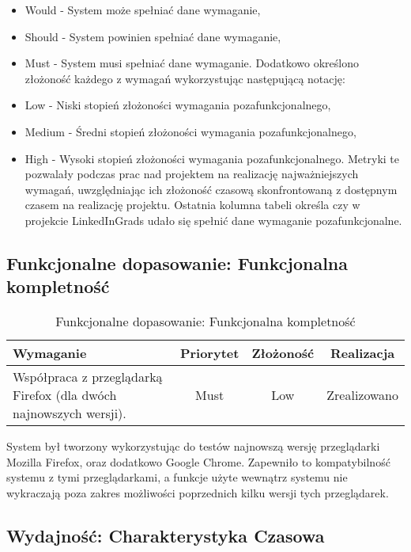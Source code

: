 \begin{itemize}
\item Would - System może spełniać dane wymaganie,
\item Should - System powinien spełniać dane wymaganie,
\item Must - System musi spełniać dane wymaganie.
Dodatkowo określono złożoność każdego z wymagań wykorzystując następującą notację:
\item Low - Niski stopień złożoności wymagania pozafunkcjonalnego,
\item Medium - Średni stopień złożoności wymagania pozafunkcjonalnego,
\item High - Wysoki stopień złożoności wymagania pozafunkcjonalnego.
Metryki te pozwalały podczas prac nad projektem na realizację najważniejszych wymagań, uwzględniając ich złożoność czasową skonfrontowaną z dostępnym czasem na realizację projektu. Ostatnia kolumna tabeli określa czy w projekcie LinkedInGrads udało się spełnić dane wymaganie pozafunkcjonalne.
\end{itemize}

\subsection{Funkcjonalne dopasowanie: Funkcjonalna kompletność}

\begin{table}[H]
\centering
\begin{tabular}{ | p{8cm} | c | c | c | }
\hline
\textbf{Wymaganie} & \textbf{Priorytet} & \textbf{Złożoność} & \textbf{Realizacja} \\ \hline
Współpraca z przeglądarką Firefox (dla dwóch najnowszych wersji). & Must & Low & Zrealizowano \\ \hline
\end{tabular}
\caption{Funkcjonalne dopasowanie: Funkcjonalna kompletność}\label{tab:reqs}
\end{table}

System był tworzony wykorzystując do testów najnowszą wersję przeglądarki Mozilla Firefox, oraz dodatkowo Google Chrome. Zapewniło to kompatybilność systemu z tymi przeglądarkami, a funkcje użyte wewnątrz systemu nie wykraczają poza zakres możliwości poprzednich kilku wersji tych przeglądarek.

\subsection{Wydajność: Charakterystyka Czasowa}

